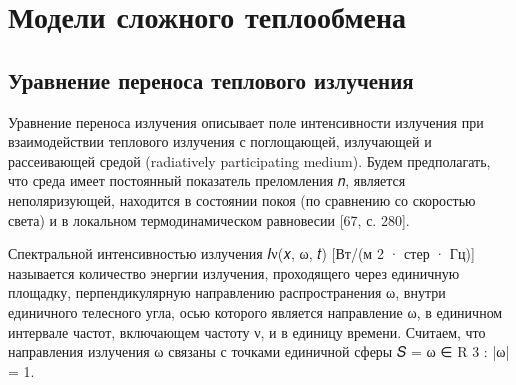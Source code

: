 \section{Модели сложного теплообмена}\label{sec:--}

\subsection{Уравнение переноса теплового излучения}\label{subsec:---}

Уравнение переноса излучения описывает поле интенсивности излучения
при взаимодействии теплового излучения с поглощающей, излучающей и рассеивающей средой
(radiatively participating medium).
Будем предполагать, что среда имеет постоянный показатель преломления 𝑛, является неполяризующей,
находится в состоянии покоя (по сравнению со скоростью света) и в локальном
термодинамическом равновесии [67, с. 280].


Спектральной интенсивностью излучения 𝐼ν(𝑥, ω, 𝑡) [Вт/(м 2 · стер · Гц)]
называется количество энергии излучения, проходящего через единичную
площадку, перпендикулярную направлению распространения ω, внутри единичного телесного угла,
осью которого является направление ω, в единичном
интервале частот, включающем частоту ν, и в единицу времени.
Считаем, что направления излучения ω связаны с точками единичной сферы 𝑆 = {ω ∈ R 3 : |ω| = 1}.


